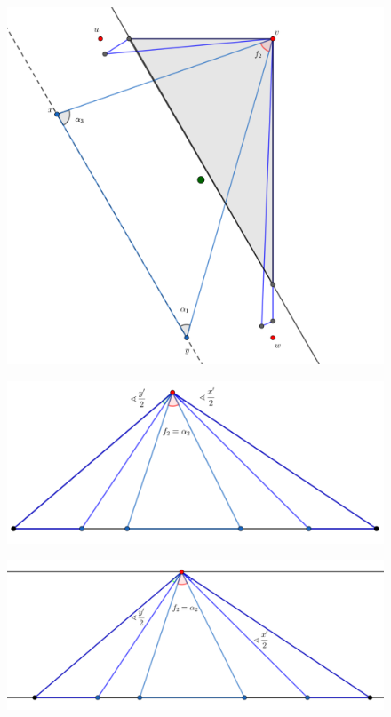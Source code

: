 {\begin{frame}
  \begin{figure}
    \centering
    \includegraphics[width=.65 \paperwidth]{./images/Bosquejo15.png}
  \end{figure}
\end{frame}

\begin{frame}
  \begin{figure}
    \centering
    \includegraphics[width=.65 \paperwidth]{./images/D1.png}
  \end{figure}
\end{frame}

\begin{frame}
  \begin{figure}
    \centering
    \includegraphics[width=.65 \paperwidth]{./images/D2.png}
  \end{figure}
\end{frame}

}
